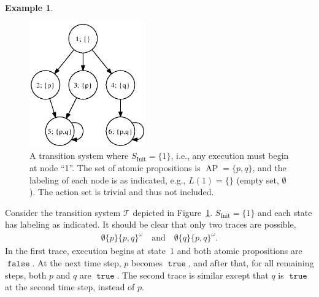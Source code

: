 \documentclass{amsart}
\DeclareMathOperator{\ap}{AP}
\DeclareMathOperator{\true}{\mathtt{true}}
\DeclareMathOperator{\false}{\mathtt{false}}
\theoremstyle{plain}
\theoremstyle{definition}
\theoremstyle{definition}
\newtheorem{examp}{Example}
\begin{document}
\begin{examp}
\begin{figure}
\includegraphics[width=5cm]{figures/exampleTS.eps}
\caption{A transition system where $S_{\mathrm{Init}}=\{ 1\}$, i.e., any execution must begin at node ``1''.  The set of atomic propositions is $\ap = \{ p,q\}$, and the labeling of each node is as indicated, e.g., $L(1) = \{\}$ (empty set, $\emptyset$).  The action set is trivial and thus not included.}
\label{fig:smallts}
\end{figure}

Consider the transition system $\mathcal{T}$ depicted in Figure~\ref{fig:smallts}.
$S_{\mathrm{Init}}=\{ 1\}$ and each state has labeling as indicated.  It should
be clear that only two traces are possible,
\begin{align*}
\emptyset \{p\} \{p,q\}^{\omega} \quad\mathrm{and}\quad \emptyset \{q\} \{p,q\}^{\omega} .
\end{align*}
In the first trace, execution begins at state~$1$ and both atomic propositions
are $\false$.  At the next time step, $p$ becomes $\true$, and after that, for
all remaining steps, both $p$ and $q$ are $\true$.  The second trace is similar
except that $q$ is $\true$ at the second time step, instead of $p$.


\end{examp}
\end{document}
